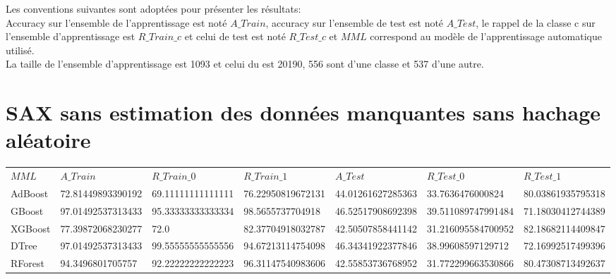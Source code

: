 \documentclass{report}
\begin{document}
	Les conventions suivantes sont adoptées pour présenter les résultats: \\
	Accuracy sur l'ensemble de l'apprentissage est noté $A\_Train$, accuracy sur l'ensemble de test est noté $A\_Test$, le rappel de la classe c sur l'ensemble d'apprentissage est $R\_Train\_c$ et celui de test est noté $R\_Test\_c$ et $MML$ correspond au modèle de l'apprentissage automatique utilisé.  \\
	
	La taille de l'ensemble d'apprentissage est 1093 et celui du est 20190, 556 sont d'une classe et 537 d'une autre.
	
	\section*{SAX sans estimation des données manquantes sans hachage aléatoire}
	
	\begin{table}[H]
		\begin{tabular} {|l|l|l|l|l|l|l|}
		\hline	
		$MML$&$A\_Train$ & $R\_Train\_0 $ & $R\_Train\_1$ & $A\_Test$ & $R\_Test\_0 $ & $R\_Test\_1$\\
		AdBoost & 72.81449893390192 & 69.11111111111111 & 76.22950819672131 & 44.01261627285363 & 33.7636476000824 & 80.03861935795318 \\
		\hline
		GBoost & 97.01492537313433 & 95.33333333333334 & 98.5655737704918 & 46.52517908692398 & 39.511089747991484 & 71.18030412744389 \\
		\hline
		XGBoost & 77.39872068230277 & 72.0 & 82.37704918032787 & 42.50507858441142 & 31.216095584700952 & 82.18682114409847  \\
		\hline
		DTree & 97.01492537313433 & 99.55555555555556 & 94.67213114754098 & 46.34341922377846 & 38.99608597129712 & 72.16992517499396 \\ 
		\hline
		RForest & 94.3496801705757 & 92.22222222222223 & 96.31147540983606 & 42.55853736768952 & 31.772299663530866 & 80.47308713492637 \\
		\hline			
		\end{tabular}
	\end{table}
\end{document}
